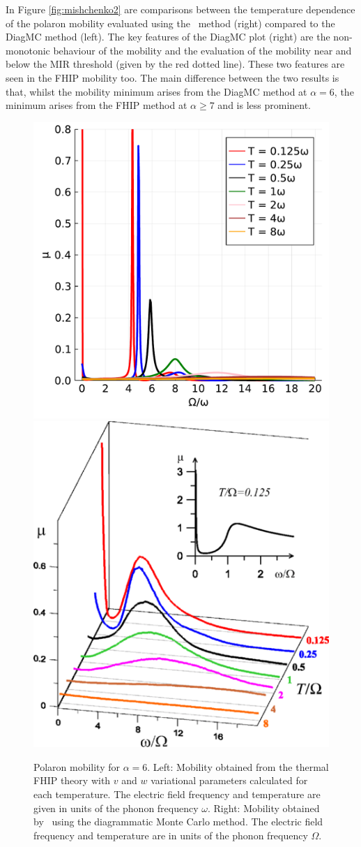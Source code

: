 In Figure \ref{fig:mishchenko2} are comparisons between the temperature dependence of the polaron mobility evaluated using the~\cite{feynman_mobility_1962} method (right) compared to the~\cite{mishchenko_polaron_2019} DiagMC method (left). The key features of the DiagMC plot (right) are the non-monotonic behaviour of the mobility and the evaluation of the mobility near and below the MIR threshold (given by the red dotted line). These two features are seen in the FHIP mobility too. The main difference between the two results is that, whilst the mobility minimum arises from the DiagMC method at $\alpha = 6$, the minimum arises from the FHIP method at $\alpha \geq 7$ and is less prominent. 

\begin{figure}[t]
    \centering
    \includegraphics[width=.49\textwidth]{figures/Mischenko_comparison.pdf}
    \includegraphics[width=.49\textwidth]{figures/medium.png}
    
    \caption{Polaron mobility for $\alpha = 6$. Left: Mobility obtained from the thermal FHIP theory with $v$ and $w$ variational parameters calculated for each temperature. The electric field frequency and temperature are given in units of the phonon frequency $\omega$. Right: Mobility obtained by~\cite{mishchenko_polaron_2019} using the diagrammatic Monte Carlo method. The electric field frequency and temperature are in units of the phonon frequency $\Omega$.}
    \label{fig:mishchenko}
\end{figure}

